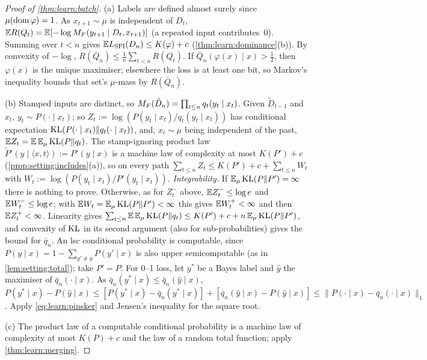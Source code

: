 \begin{proof}[Proof of \cref{thm:learn:batch}]
(a) Labels are defined almost surely since $\mu(\operatorname{dom}\varphi)=1$. As $x_{t+1}\sim\mu$ is independent of $D_t$, $\mathbb{E} R(Q_t)=\mathbb{E}[-\log M_{F}(y_{t+1}\mid D_t,x_{t+1})]$ (a repeated input contributes~$0$). Summing over $t<n$ gives $\mathbb{E}L_{\mathrm{SFI}}(D_n)\le K(\varphi)+c$ (\cref{thm:learn:dominance}(b)). By convexity of $-\log$, $R(\bar Q_n)\le\frac1n\sum_{t<n}R(Q_t)$. If $\bar Q_n(\varphi(x)\mid x)>\frac12$, then $\varphi(x)$ is the unique maximiser; elsewhere the loss is at least one bit, so Markov's inequality bounds that set's $\mu$-mass by $R(\bar Q_n)$.

(b) Stamped inputs are distinct, so $M_{F}(\tilde D_n)=\prod_{t\le n}q_t(y_t\mid x_t)$. Given $\tilde D_{t-1}$ and $x_t$, $y_t\sim P(\cdot\mid x_t)$; so $Z_t:=\log(P(y_t\mid x_t)/q_t(y_t\mid x_t))$ has conditional expectation $\operatorname{KL}(P(\cdot\mid x_t)\|q_t(\cdot\mid x_t))$, and, $x_t\sim\mu$ being independent of the past, $\mathbb{E} Z_t=\mathbb{E}\,\mathbb{E}_\mu\operatorname{KL}(P\|q_t)$. The stamp-ignoring product law $\tilde P'(y\mid\langle x,t\rangle):=P'(y\mid x)$ is a machine law of complexity at most $K(P')+c$ (\cref{prop:setting:includes}(a)), so on every path $\sum_{t\le n}Z_t\le K(P')+c+\sum_{t\le n}W_t$ with $W_t:=\log(P(y_t\mid x_t)/P'(y_t\mid x_t))$.
\emph{Integrability.} If $\mathbb{E}_\mu\operatorname{KL}(P\|P')=\infty$ there is nothing to prove. Otherwise, as for $Z_t^-$ above, $\mathbb{E} Z_t^-\le\log e$ and $\mathbb{E} W_t^-\le\log e$; with $\mathbb{E} W_t=\mathbb{E}_\mu\operatorname{KL}(P\|P')<\infty$ this gives $\mathbb{E} W_t^+<\infty$ and then $\mathbb{E} Z_t^+<\infty$. Linearity gives $\sum_{t\le n}\mathbb{E}\,\mathbb{E}_\mu\operatorname{KL}(P\|q_t)\le K(P')+c+n\,\mathbb{E}_\mu\operatorname{KL}(P\|P')$, and convexity of $\operatorname{KL}$ in its second argument (also for sub-probabilities) gives the bound for $\bar q_n$. An lsc conditional probability is computable, since $P(y\mid x)=1-\sum_{y'\ne y}P(y'\mid x)$ is also upper semicomputable (as in \cref{lem:setting:total}); take $P'=P$.
For 0--1 loss, let $y^*$ be a Bayes label and $\hat y$ the maximiser of $\bar q_n(\cdot\mid x)$. As $\bar q_n(y^*\mid x)\le\bar q_n(\hat y\mid x)$, $P(y^*\mid x)-P(\hat y\mid x)\le[P(y^*\mid x)-\bar q_n(y^*\mid x)]+[\bar q_n(\hat y\mid x)-P(\hat y\mid x)]\le\|P(\cdot\mid x)-\bar q_n(\cdot\mid x)\|_1$. Apply \eqref{eq:learn:pinsker} and Jensen's inequality for the square root.

(c) The product law of a computable conditional probability is a machine law of complexity at most $K(P)+c$ and the law of a random total function; apply \cref{thm:learn:merging}.
\end{proof}

